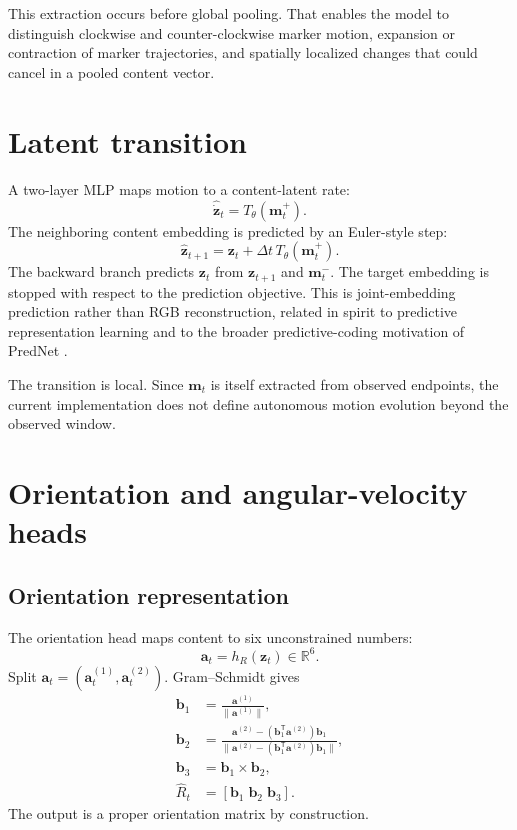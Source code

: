 \documentclass[11pt,a4paper]{article}
\newcommand{\R}{\mathbb R}
\newcommand{\vect}[1]{\mathbf{#1}}
\begin{document}
This extraction occurs before global pooling. That enables the model to distinguish clockwise and counter-clockwise marker motion, expansion or contraction of marker trajectories, and spatially localized changes that could cancel in a pooled content vector.

\section{Latent transition}
A two-layer MLP maps motion to a content-latent rate:
\begin{equation}
\widehat{\dot{\vect z}}_t=T_\theta(\vect m_t^+).
\end{equation}
The neighboring content embedding is predicted by an Euler-style step:
\begin{equation}
\hat{\vect z}_{t+1}=\vect z_t+\Delta t\,T_\theta(\vect m_t^+).
\end{equation}
The backward branch predicts $\vect z_t$ from $\vect z_{t+1}$ and $\vect m_t^-$. The target embedding is stopped with respect to the prediction objective. This is joint-embedding prediction rather than RGB reconstruction, related in spirit to predictive representation learning \citep{assran2023ijepa} and to the broader predictive-coding motivation of PredNet \citep{lotter2016prednet}.

The transition is local. Since $\vect m_t$ is itself extracted from observed endpoints, the current implementation does not define autonomous motion evolution beyond the observed window.

\section{Orientation and angular-velocity heads}
\subsection{Orientation representation}
The orientation head maps content to six unconstrained numbers:
\begin{equation}
\vect a_t=h_R(\vect z_t)\in\R^6.
\end{equation}
Split $\vect a_t=(\vect a_t^{(1)},\vect a_t^{(2)})$. Gram--Schmidt gives
\begin{align}
\vect b_1&=\frac{\vect a^{(1)}}{\|\vect a^{(1)}\|},\\
\vect b_2&=\frac{\vect a^{(2)}-(\vect b_1^\mathsf T\vect a^{(2)})\vect b_1}
{\|\vect a^{(2)}-(\vect b_1^\mathsf T\vect a^{(2)})\vect b_1\|},\\
\vect b_3&=\vect b_1\times\vect b_2,\\
\hat R_t&=[\vect b_1\;\vect b_2\;\vect b_3].
\end{align}
The output is a proper orientation matrix by construction.
\end{document}
